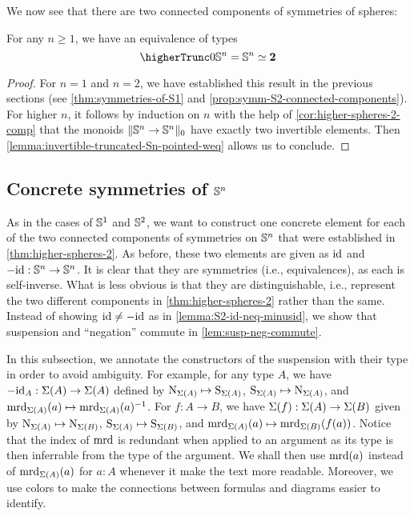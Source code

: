 \documentclass[english,a4paper]{lmcs}
\begin{document}
We now see that there are two connected components of symmetries of spheres:
\begin{thm} \label{thm:higher-spheres-2}
    For any $n \geq 1$, we have an equivalence of types
    \begin{equation}
    \higherTrunc 0 {\Sn n= \Sn n} \weq \bn 2
    \end{equation}
\end{thm}
\begin{proof}
  For $n = 1$ and $n=2$, we have established this result in the previous
  sections (see \cref{thm:symmetries-of-S1} and
  \cref{prop:symm-S2-connected-components}).  For higher $n$, it follows by
  induction on $n$ with the help of \cref{cor:higher-spheres-2-comp} that the
  monoids $\lVert{\mathbb S^{n}} \to {\mathbb S^{n}}\rVert_0$ have exactly two invertible elements.
  Then \cref{lemma:invertible-truncated-Sn-pointed-weq} allows us to conclude.
\end{proof}

\subsection{Concrete symmetries of \texorpdfstring{${\mathbb S^{n}}$}{Sn}}

As in the cases of ${{\mathbb S^{1}}}$ and ${{\mathbb S^{2}}}$, we want to construct one concrete element for each of the two connected components of symmetries on ${\mathbb S^{n}}$ that were established in \cref{thm:higher-spheres-2}.
As before, these two elements are given as $\mathord{\mathrm{id}}$ and $-\mathord{\mathrm{id}} : {\mathbb S^{n}} \to {\mathbb S^{n}}$.
It is clear that they are symmetries (i.e., equivalences), as each is self-inverse.
What is less obvious is that they are distinguishable, i.e., represent the two different components in \cref{thm:higher-spheres-2} rather than the same.
Instead of showing $\mathord{\mathrm{id}} \neq -\mathord{\mathrm{id}}$ as in \cref{lemma:S2-id-neq-minusid}, we show that suspension and ``negation'' commute in \cref{lem:susp-neg-commute}.

In this subsection, we annotate the constructors of the suspension with their type in order to avoid ambiguity.
For example, for any type $A$, we have $-\mathord{\mathrm{id}}_A : \operatorname{\Sigma}(A) \to \operatorname{\Sigma}(A)$ defined by
$\mathrm{N}_{\operatorname{\Sigma}(A)} \mapsto \mathrm{S}_{\operatorname{\Sigma}(A)}$,
$\mathrm{S}_{\operatorname{\Sigma}(A)} \mapsto \mathrm{N}_{\operatorname{\Sigma}(A)}$,
and $\operatorname{\mathrm{mrd}}_{\operatorname{\Sigma}(A)}(a) \mapsto \operatorname{\mathrm{mrd}}_{\operatorname{\Sigma}(A)}(a)^{-1}$.
For $f : A \to B$, we have $\operatorname{\Sigma}(f) : \operatorname{\Sigma}(A) \to \operatorname{\Sigma}(B)$ given by $\mathrm{N}_{\operatorname{\Sigma}(A)} \mapsto \mathrm{N}_{\operatorname{\Sigma}(B)}$,
$\mathrm{S}_{\operatorname{\Sigma}(A)} \mapsto \mathrm{S}_{\operatorname{\Sigma}(B)}$,
and $\operatorname{\mathrm{mrd}}_{\operatorname{\Sigma}(A)}(a) \mapsto \operatorname{\mathrm{mrd}}_{\operatorname{\Sigma}(B)}(f(a))$.
Notice that the index of $\operatorname{\mathrm{mrd}}$ is redundant when applied to an argument as its type is then inferrable from the type of the argument. We shall then use $\operatorname{\mathrm{mrd}}(a)$ instead of $\operatorname{\mathrm{mrd}}_{\operatorname{\Sigma}(A)}(a)$ for $a:A$ whenever it make the text more readable.
Moreover, we use colors to make the connections between formulas and diagrams easier to identify.
\end{document}
